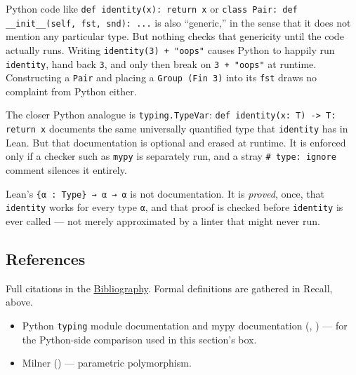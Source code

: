 \begin{progcorner}

Python code like \texttt{def identity(x): return x} or \texttt{class Pair: def \_\allowbreak{}\_\allowbreak{}init\_\allowbreak{}\_\allowbreak{}(self, fst, snd): ...} is also ``generic,'' in the sense that it does not mention any particular type. But nothing checks that genericity until the code actually runs. Writing \texttt{identity(3) + "oops"} causes Python to happily run \texttt{identity}, hand back \texttt{3}, and only then break on \texttt{3 + "oops"} at runtime. Constructing a \texttt{Pair} and placing a \texttt{Group (Fin 3)} into its \texttt{fst} draws no complaint from Python either.

\end{progcorner}

The closer Python analogue is \texttt{typing.TypeVar}: \texttt{def identity(x: T) -\allowbreak{}> T: return x} documents the same universally quantified type that \texttt{identity} has in Lean. But that documentation is optional and erased at runtime. It is enforced only if a checker such as \texttt{mypy} is separately run, and a stray \texttt{\# type: ignore} comment silences it entirely.

Lean's \texttt{\{α : Type\} → α → α} is not documentation. It is \emph{proved}, once, that \texttt{identity} works for every type \texttt{α}, and that proof is checked before \texttt{identity} is ever called --- not merely approximated by a linter that might never run.

\subsection{References}\label{sec:02-functions-and-structures:02-type-parameters:3}

Full citations in the \hyperref[sec:root:bibliography:1]{Bibliography}. Formal definitions are gathered in Recall, above.

\begin{itemize}
\tightlist
\item
  Python \texttt{typing} module documentation and mypy documentation (\cite{PythonTyping}, \cite{MypyDocs}) --- for the Python-side comparison used in this section's box.
\item
  Milner (\cite{Milner1978}) --- parametric polymorphism.
\end{itemize}
